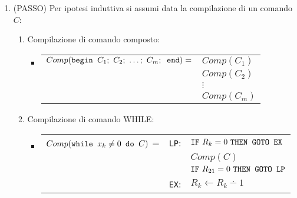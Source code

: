 \begin{enumerate}
\begin{itemize}
\begin{itemize}
\begin{tabular}{l|r l|l}
                        && $R_{j}\leftarrow R_{j}+1$ \\
                        && $R_{22}\leftarrow R_{22}\dotminus 1$ \\
                        && $\goto{R_{21}}{\texttt{E2}}$ \\
                        &\texttt{E3}:& $R_k\leftarrow R_k+/\dotminus 1$ \\ \cline{2-3}
                        \end{tabular}\vspace{.5cm}
                \end{itemize}
        \end{itemize}
    \item (PASSO) Per ipotesi induttiva si assumi data la compilazione di un comando
        $C$:
        \begin{enumerate}
            \item Compilazione di comando composto:
                \begin{itemize}
                    \renewcommand{\labelitemi}{\raisebox{6.6\height}{\textbullet}}
                    \item \renewcommand{\arraystretch}{1.25} 
                        \begin{tabular}{l| l|}\cline{2-2}
                        $Comp(\texttt{begin } C_ 1; \ C_2; \ \dots; \ C_m; \texttt{ end})=$&
                            $Comp(C_1)$\\
                            & $Comp(C_2)$\\
                            & $\vdots$\\
                            & $Comp(C_m)$\\ \cline{2-2}
                    \end{tabular}
                \end{itemize}
            \item Compilazione di comando WHILE:
                \begin{itemize}
                    \renewcommand{\labelitemi}{\raisebox{6\height}{\textbullet}}
                    \item \renewcommand{\arraystretch}{1.25} 
                        \begin{tabular}{l|r l|}\cline{2-3}
                        $Comp( \texttt{while } x_k\neq0 \texttt{ do } C)$ =& \texttt{LP}:&
                            $\texttt{IF}\text{ $R_k=0$ }\texttt{THEN GOTO }\text{$\texttt{EX}$}$\\
                            && $Comp(C)$\\
                            && $\texttt{IF}\text{ $R_{21}=0$ }\texttt{THEN GOTO }\text{$\texttt{LP}$}$\\
                            &\texttt{EX}:& $R_k\leftarrow R_k\dotminus 1$\\ \cline{2-3}
                    \end{tabular}
                \end{itemize}
        \end{enumerate}
\end{enumerate}

